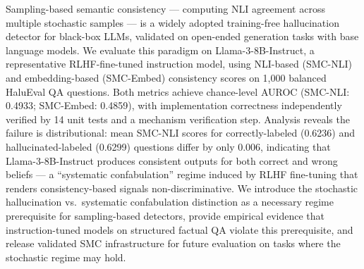 Sampling-based semantic consistency --- computing NLI agreement across multiple stochastic samples --- is a widely adopted training-free hallucination detector for black-box LLMs, validated on open-ended generation tasks with base language models. We evaluate this paradigm on Llama-3-8B-Instruct, a representative RLHF-fine-tuned instruction model, using NLI-based (SMC-NLI) and embedding-based (SMC-Embed) consistency scores on 1,000 balanced HaluEval QA questions. Both metrics achieve chance-level AUROC (SMC-NLI: 0.4933; SMC-Embed: 0.4859), with implementation correctness independently verified by 14 unit tests and a mechanism verification step. Analysis reveals the failure is distributional: mean SMC-NLI scores for correctly-labeled (0.6236) and hallucinated-labeled (0.6299) questions differ by only 0.006, indicating that Llama-3-8B-Instruct produces consistent outputs for both correct and wrong beliefs --- a ``systematic confabulation'' regime induced by RLHF fine-tuning that renders consistency-based signals non-discriminative. We introduce the stochastic hallucination vs.\ systematic confabulation distinction as a necessary regime prerequisite for sampling-based detectors, provide empirical evidence that instruction-tuned models on structured factual QA violate this prerequisite, and release validated SMC infrastructure for future evaluation on tasks where the stochastic regime may hold.
